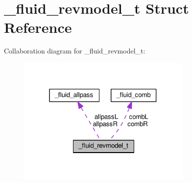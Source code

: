 \hypertarget{struct__fluid__revmodel__t}{}\section{\+\_\+fluid\+\_\+revmodel\+\_\+t Struct Reference}
\label{struct__fluid__revmodel__t}


Collaboration diagram for \+\_\+fluid\+\_\+revmodel\+\_\+t\+:
\nopagebreak
\begin{figure}[H]
\begin{center}
\leavevmode
\includegraphics[width=244pt]{struct__fluid__revmodel__t__coll__graph}
\end{center}
\end{figure}
